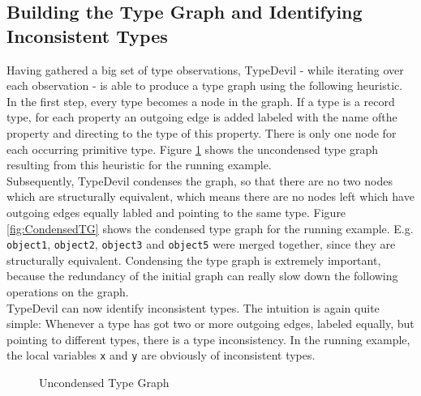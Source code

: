 \documentclass[runningheads,a4paper]{llncs}
\begin{document}
\subsection{Building the Type Graph and Identifying Inconsistent Types}
\label{TGs}
Having gathered a big set of type observations, TypeDevil - while iterating over each observation - is able to produce a type graph using the following heuristic.
In the first step, every type becomes a node in the graph.
If a type is a record type, for each property an outgoing edge is added labeled with the name ofthe property and directing to the type of this property. 
There is only one node for each occurring primitive type.
Figure \ref{fig:UncondensedTG} shows the uncondensed type graph resulting from this heuristic for the running example.\\
Subsequently, TypeDevil condenses the graph, so that there are no two nodes which are structurally equivalent, which means there are no nodes left which have outgoing edges equally labled and pointing to the same type.
Figure \ref{fig:CondensedTG} shows the condensed type graph for the running example.
E.g. \lstinline[columns=fixed]{object1}, \lstinline[columns=fixed]{object2}, \lstinline[columns=fixed]{object3} and \lstinline[columns=fixed]{object5} were merged together, since they are structurally equivalent.
Condensing the type graph is extremely important, because the redundancy of the initial graph can really slow down the following operations on the graph. \\
TypeDevil can now identify inconsistent types. 
The intuition is again quite simple: 
Whenever a type has got two or more outgoing edges, labeled equally, but pointing to different types, there is a type inconsistency.
In the running example, the local variables \lstinline[columns=fixed]{x} and \lstinline[columns=fixed]{y} are obviously of inconsistent types.

\begin{figure}[h]
\caption{Uncondensed Type Graph}
\label{fig:UncondensedTG}
\end{figure}
\end{document}
